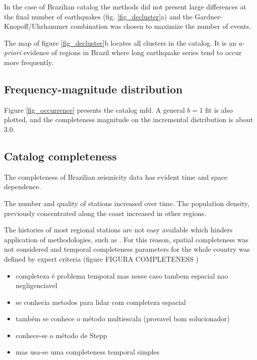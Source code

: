 \documentclass[draft, grl]{agutex}
\begin{document}
\begin{article}
In the case of Brazilian catalog the methods did not present large differences at the final number of earthquakes (fig. \ref{fig_decluster}a) and the Gardner-Knopoff/Uhrhammer combination was chosen to maximize the number of events.

The map of figure \ref{fig_decluster}b locates all clusters in the catalog. It is an \emph{a-priori} evidence of regions in Brazil where long earthquake series tend to occur more frequently.



\subsection{Frequency-magnitude distribution}

Figure \ref{fig_occurrence} presents the catalog \gls{mfd}.
A general $b=1$ fit is also plotted, and the completeness magnitude on the incremental distribution is about 3.0.



\subsection{Catalog completeness}

The completeness of Brazilian seismicity data has evident time and space dependence.

The number and quality of stations increased over time. The population density, previously concentrated along the coast increased in other regions.


The histories of most regional stations are not easy available which hinders application of methodologies, such as \citet{mignan_2011}. For this reason, spatial completeness was not considered and temporal completeness parameters for the whole country was defined by expert criteria (figure FIGURA COMPLETENESS )


\begin{itemize}
	\item completeza é problema temporal mas nesse caso tambem espacial nao negligenciavel
	\item se conhecia metodos para lidar com completeza espacial
	\item também se conhece o método multiescala (provavel bom solucionador)
	\item conhece-se o método de Stepp
	\item mas usa-se uma completeness temporal simples
\end{itemize}



\end{article}
\end{document}
